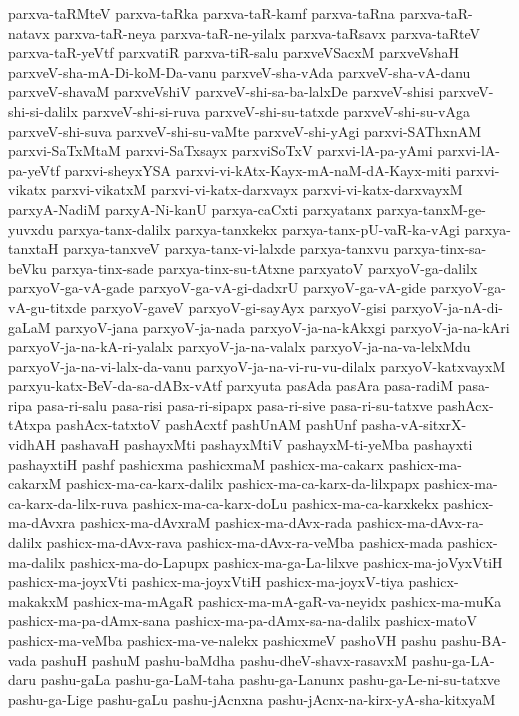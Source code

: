 {parxva-taRMteV
parxva-taRka
parxva-taR-kamf
parxva-taRna
parxva-taR-natavx
parxva-taR-neya
parxva-taR-ne-yilalx
parxva-taRsavx
parxva-taRteV
parxva-taR-yeVtf
parxvatiR
parxva-tiR-salu
parxveVSacxM
parxveVshaH
parxveV-sha-mA-Di-koM-Da-vanu
parxveV-sha-vAda
parxveV-sha-vA-danu
parxveV-shavaM
parxveVshiV
parxveV-shi-sa-ba-lalxDe
parxveV-shisi
parxveV-shi-si-dalilx
parxveV-shi-si-ruva
parxveV-shi-su-tatxde
parxveV-shi-su-vAga
parxveV-shi-suva
parxveV-shi-su-vaMte
parxveV-shi-yAgi
parxvi-SAThxnAM
parxvi-SaTxMtaM
parxvi-SaTxsayx
parxviSoTxV
parxvi-lA-pa-yAmi
parxvi-lA-pa-yeVtf
parxvi-sheyxYSA
parxvi-vi-kAtx-Kayx-mA-naM-dA-Kayx-miti
parxvi-vikatx
parxvi-vikatxM
parxvi-vi-katx-darxvayx
parxvi-vi-katx-darxvayxM
parxyA-NadiM
parxyA-Ni-kanU
parxya-caCxti
parxyatanx
parxya-tanxM-ge-yuvxdu
parxya-tanx-dalilx
parxya-tanxkekx
parxya-tanx-pU-vaR-ka-vAgi
parxya-tanxtaH
parxya-tanxveV
parxya-tanx-vi-lalxde
parxya-tanxvu
parxya-tinx-sa-beVku
parxya-tinx-sade
parxya-tinx-su-tAtxne
parxyatoV
parxyoV-ga-dalilx
parxyoV-ga-vA-gade
parxyoV-ga-vA-gi-dadxrU
parxyoV-ga-vA-gide
parxyoV-ga-vA-gu-titxde
parxyoV-gaveV
parxyoV-gi-sayAyx
parxyoV-gisi
parxyoV-ja-nA-di-gaLaM
parxyoV-jana
parxyoV-ja-nada
parxyoV-ja-na-kAkxgi
parxyoV-ja-na-kAri
parxyoV-ja-na-kA-ri-yalalx
parxyoV-ja-na-valalx
parxyoV-ja-na-va-lelxMdu
parxyoV-ja-na-vi-lalx-da-vanu
parxyoV-ja-na-vi-ru-vu-dilalx
parxyoV-katxvayxM
parxyu-katx-BeV-da-sa-dABx-vAtf
parxyuta
pasAda
pasAra
pasa-radiM
pasa-ripa
pasa-ri-salu
pasa-risi
pasa-ri-sipapx
pasa-ri-sive
pasa-ri-su-tatxve
pashAcx-tAtxpa
pashAcx-tatxtoV
pashAcxtf
pashUnAM
pashUnf
pasha-vA-sitxrX-vidhAH
pashavaH
pashayxMti
pashayxMtiV
pashayxM-ti-yeMba
pashayxti
pashayxtiH
pashf
pashicxma
pashicxmaM
pashicx-ma-cakarx
pashicx-ma-cakarxM
pashicx-ma-ca-karx-dalilx
pashicx-ma-ca-karx-da-lilxpapx
pashicx-ma-ca-karx-da-lilx-ruva
pashicx-ma-ca-karx-doLu
pashicx-ma-ca-karxkekx
pashicx-ma-dAvxra
pashicx-ma-dAvxraM
pashicx-ma-dAvx-rada
pashicx-ma-dAvx-ra-dalilx
pashicx-ma-dAvx-rava
pashicx-ma-dAvx-ra-veMba
pashicx-mada
pashicx-ma-dalilx
pashicx-ma-do-Lapupx
pashicx-ma-ga-La-lilxve
pashicx-ma-joVyxVtiH
pashicx-ma-joyxVti
pashicx-ma-joyxVtiH
pashicx-ma-joyxV-tiya
pashicx-makakxM
pashicx-ma-mAgaR
pashicx-ma-mA-gaR-va-neyidx
pashicx-ma-muKa
pashicx-ma-pa-dAmx-sana
pashicx-ma-pa-dAmx-sa-na-dalilx
pashicx-matoV
pashicx-ma-veMba
pashicx-ma-ve-nalekx
pashicxmeV
pashoVH
pashu
pashu-BA-vada
pashuH
pashuM
pashu-baMdha
pashu-dheV-shavx-rasavxM
pashu-ga-LA-daru
pashu-gaLa
pashu-ga-LaM-taha
pashu-ga-Lanunx
pashu-ga-Le-ni-su-tatxve
pashu-ga-Lige
pashu-gaLu
pashu-jAcnxna
pashu-jAcnx-na-kirx-yA-sha-kitxyaM
}
